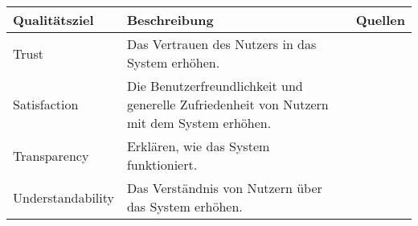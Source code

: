 \begin{table}[htb!]
    \begin{center}
        \begin{tabular}{|p{}|p{}|p{}|}
            \hline
            \textbf{Qualitätsziel}    & \textbf{Beschreibung} & \textbf{Quellen} \\ \hline
            Trust                       & Das Vertrauen des Nutzers in das System erhöhen.
                                        & \cite{nunes_systematic_2017} \cite{chazette_knowledge_nodate} \cite{tintarev_designing_nodate} \cite{balog_measuring_2020} \cite{eiband_impact_2019} \cite{tintarev2015explaining} \cite{hernandez-bocanegra_effects_2020} \cite{stange_effects_2021} \cite{weitz_you_2019} \cite{yamada_evaluating_2016} \cite{haspiel_explanations_2018} \cite{martin_developing_2019} \cite{martin_evaluating_2021} \cite{tsai_effects_2020}  \cite{sokol_one_2020}  \cite{wang_is_2018} \cite{koo_understanding_2016} \cite{wiegand2019drive} \cite{gunning2019darpa} \cite{lim_2009_assessing} \cite{tintarev2007survey} \cite{kunkel_let_2019} \\ \hline
            Satisfaction                & Die Benutzerfreundlichkeit und generelle Zufriedenheit von Nutzern mit dem System erhöhen.
                                        & \cite{nunes_systematic_2017} \cite{chazette_knowledge_nodate} \cite{tintarev_designing_nodate} \cite{balog_measuring_2020} \cite{tsai_evaluating_2019} \cite{tintarev2015explaining} \cite{riveiro_thats_2021} \cite{martin_developing_2019} \cite{martin_evaluating_2021} \cite{tsai_effects_2020} \cite{ehsan_human-centered_2020} \cite{sovrano_modelling_2020} \cite{koo_understanding_2016} \cite{ribera2019can} \cite{gunning2019darpa} \cite{lim_2009_assessing}  \cite{tintarev2007survey} \cite{sato_context_nodate} \\ \hline
            Transparency                & Erklären, wie das System funktioniert.
                                        & \cite{nunes_systematic_2017} \cite{chazette_knowledge_nodate} \cite{tintarev_designing_nodate} \cite{chazette_end-users_nodate} \cite{balog_measuring_2020} \cite{chazette2020explainability} \cite{tintarev2015explaining} \cite{hernandez-bocanegra_effects_2020} \cite{tsai_effects_2020} \cite{rjoob_towards_2021}  \cite{sokol_one_2020} \cite{wang_is_2018} \cite{koo_understanding_2016} \cite{tintarev2007survey}\\ \hline
            Understandability           & Das Verständnis von Nutzern über das System erhöhen.
                                        & \cite{chazette_knowledge_nodate} \cite{chazette_end-users_nodate} \cite{martin_evaluating_2021}  \cite{ehsan_human-centered_2020} \cite{rjoob_towards_2021}  \cite{sokol_one_2020} \cite{cheng2019explaining} \\ \hline

\end{tabular}
\end{center}
\end{table}
